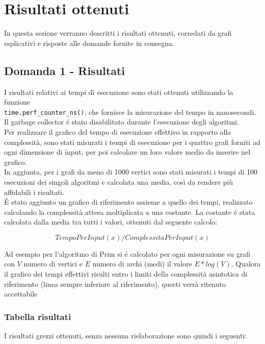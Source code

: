 \section{Risultati ottenuti}
In questa sezione verranno descritti i risultati ottenuti, corredati da grafi esplicativi e risposte alle domande fornite in consegna.
\subsection{Domanda 1 - Risultati}
I risultati relativi ai tempi di esecuzione sono stati ottenuti utilizzando la funzione \\ \texttt{time.perf\_counter\_ns()}, che fornisce la misurazione del tempo in nanosecondi. Il garbage collector é stato disabilitato durante l'esecuzione degli algoritmi. \\ 
Per realizzare il grafico del tempo di esecuzione effettivo in rapporto alla complessità, sono stati misurati i tempi di esecuzione per i quattro grafi forniti ad ogni dimensione di input, per poi calcolare un loro valore medio da inserire nel grafico. \\
In aggiunta, per i grafi da meno di 1000 vertici sono stati misurati i tempi di 100 esecuzioni dei singoli algoritmi e calcolata una media, così da rendere più affidabili i risultati. \\
É stato aggiunto un grafico di riferimento assieme a quello dei tempi, realizzato calcolando la complessità attesa moltiplicata a una costante. La costante é stata calcolata dalla media tra tutti i valori, ottenuti dal seguente calcolo:

\[ TempoPerInput(x) / ComplessitaPerInput(x) \]

Ad esempio per l'algoritmo di Prim si é calcolato per ogni misurazione su grafi con $V$ numero di vertici e $E$ numero di archi (medi) il valore $E*log(V)$.
Qualora il grafico dei tempi effettivi risulti entro i limiti della complessità asintotica di riferimento (linea sempre inferiore al riferimento), questi verrà ritenuto accettabile

\subsubsection{Tabella risultati}
I risultati grezzi ottenuti, senza nessuna rielaborazione sono quindi i seguenti:


